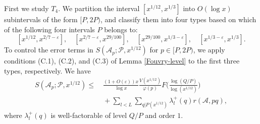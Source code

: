 \documentclass[12pt, a4paper]{amsart}
\theoremstyle{plain}
\theoremstyle{remark}
\numberwithin{equation}{section}
\begin{document}
First we study \( T_4 \).  
We partition the interval \([x^{1/12}, x^{1/3}]\) into \(O(\log x)\) subintervals of the form \([P, 2P)\), 
and classify them into four types based on which of the following four intervals $P$ belongs to:  
\[
[x^{1/12}, x^{2/7-\varepsilon}],\quad [x^{2/7-\varepsilon}, x^{29/100}],\quad [x^{29/100}, 
x^{1/3-\varepsilon}], \quad [x^{1/3-\varepsilon}, x^{1/3}].
\]
To control the error terms in \( S(\mathscr{A}_p; \mathscr{P}, x^{1/12}) \) for \( p \in [P, 2P) \), 
we apply conditions (C.1), (C.2), and (C.3) of Lemma \ref{Fouvry-level} to the first three types,  
respectively. We have
\begin{equation}
\begin{aligned}
S(\mathscr{A}_{p};\mathscr{P},x^{1/12}) 
\leqslant &\ \frac{(1+O(\varepsilon))x}{\log x}\frac{V(x^{1/12})}{\varphi(p)}F\bigg(\frac{\log(Q/P)}{\log (x^{1/12})}\bigg) \\ 
&\ + \sum_{l<L}\sum_{q|P(x^{1/12})}\lambda_{l}^{+}(q)r(\mathscr{A},pq), 
\end{aligned}
\end{equation}
where \( \lambda_{l}^{+}(q) \) is well-factorable of level \( Q/P \) and order $1$.
\end{document}
